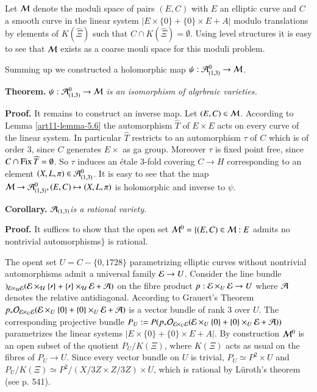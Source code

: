 Let $\mathcal{M}$ denote the moduli space of pairs $(E, C)$ with $E$ an elliptic curve and $C$ a smooth curve in the linear system $|E \times \{0\} + \{0\} \times E + A|$ modulo translations by elements of $K(\widehat{\Xi})$ such that $C\cap K(\widehat{\Xi}) = \emptyset$. Using level structures it is easy to see that $\mathcal{M}$ exists as a coarse mouli space for this moduli problem.

Summing up we constructed a holomorphic map $\psi : \mathcal{A}_{(1,3)}^{0} \rightarrow \mathcal{M}$.

\medskip
\noindent
{\bfseries {} Theorem.\label{art11-thm-6.1}} $\psi : \mathcal{A}_{(1,3)}^{0} \rightarrow \mathcal{M}$ \textit{is an isomorphism of algrbraic varieties.}

\medskip
\noindent
{\bfseries Proof.} It remains to construct an inverse map. Let $(E, C) \in \mathcal{M}$. According to Lemma \ref{art11-lemma-5.6}
the automorphism $\widehat{T}$ of $E \times E$ acts on every curve of the linear system. In particular $\widehat{T}$ restricts to an automorphism $\tau$ of $C$  which is of order 3, since $C$ generates $E \times $ as ga group. Moreover $\tau$ is fixed point free, since $C \cap \operatorname{Fix} \widehat{T}= \emptyset$. So $\tau$ induces an \'etale 3-fold covering $C \rightarrow H$ corresponding to an element $(X, L, \pi) \in \mathcal{A}_{(1,3)}^{0}$. It is easy to see that the map $\mathcal{M} \rightarrow \mathcal{A}_{(1,3)}^{0}, (E, C)\mapsto (X, L, \pi)$ is holomorphic and inverse to $\psi$.

\medskip
\noindent
{\bfseries {} Corollary.\label{art11-thm-6.2}} $\mathcal{A}_{(1,3)}$\textit{is a rational variety.}

\medskip
\noindent
{\bfseries Proof.} It suffices to show that the open set $\mathcal{M}^{0} =\{(E, C)\in \mathcal{M} : E$ admits no nontrivial automorphisms$\}$ is rational.

The opent set $U = C-\{0,1728\}$ parametrizing elliptic curves without nontrivial automorphisms admit a universal family $\mathcal{E} \rightarrow U$. Consider the line bundle $\cal)_{\mathcal{E} \times_{U} \mathcal{E}}(\mathcal{E} \times_{U}\{0\} + \{0\} \times_{U}\mathcal{E} + \mathcal{A})$ on the fibre product $p: \mathcal{E} \times_{U} \mathcal{E} \rightarrow U$ where $\mathcal{A}$ denotes the relative antidiagonal. According to Grauert's Theorem $p_{*}\mathcal{O}_{\mathcal{E}\times_{U}\mathcal{E}}(\mathcal{E} \times_{U}\{0\} + \{0\} \times_{U}\mathcal{E} + \mathcal{A})$ is a vector bundle of rank 3 over $U$. The corresponding projective bundle $P_{U}:=P(p_{*}\mathcal{O}_{\mathcal{E} \times_{U}\mathcal{E}}(\mathcal{E} \times_{U}\{ 0\} + \{0\} \times_{U}\mathcal{E} + \mathcal{A}))$ parametrizes the linear systems $|E \times \{0\} + \{0\} \times E + A|$. By construction $\mathcal{M}^{0}$ is an open subset of the quotient $P_{U}/K(\Xi)$, where $K(\Xi)$ acts as usual on the fibres of $P_{U}\rightarrow U$. Since every vector bundle on $U$ is trivial, $P_{U}\simeq P^{2} \times U$ and $P_{U}/K(\Xi)\simeq P^{2} /(X/3Z \times Z /3Z)\times U$, which is
rational by L\"uroth's theorem (see \cite{art11-keyG-H} p. 541).

